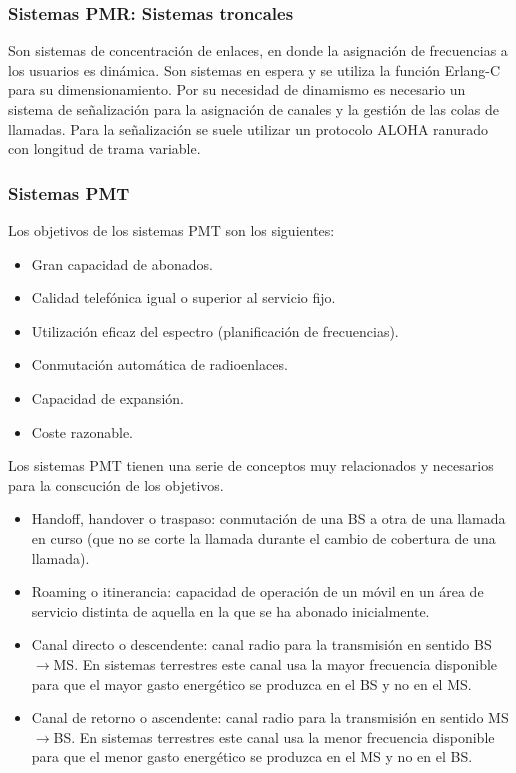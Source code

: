 \subsubsection{Sistemas PMR: Sistemas troncales}
\label{ssub:troncales}
	Son sistemas de concentración de enlaces, en donde la asignación de frecuencias a los usuarios es dinámica. Son sistemas en espera y se utiliza la función Erlang-C para su dimensionamiento. Por su necesidad de dinamismo es necesario un sistema de señalización para la asignación de canales y la gestión de las colas de llamadas. Para la señalización se suele utilizar un protocolo ALOHA ranurado con longitud de trama variable.\\	
\subsubsection{Sistemas PMT}
\label{ssub:PMT}
	Los objetivos de los sistemas PMT son los siguientes:
\begin{itemize}
	\item Gran capacidad de abonados.
	\item Calidad telefónica igual o superior al servicio fijo.
	\item Utilización eficaz del espectro (planificación de frecuencias).
	\item Conmutación automática de radioenlaces.
	\item Capacidad de expansión.
	\item Coste razonable.
\end{itemize}
Los sistemas PMT tienen una serie de conceptos muy relacionados y necesarios para la conscución de los objetivos.
\begin{itemize}
	\item Handoff, handover o traspaso: conmutación de una BS a otra de una llamada en curso (que no se corte la llamada durante el cambio de cobertura de una llamada).
	\item Roaming o itinerancia: capacidad de operación de un móvil en un área de servicio distinta de aquella en la que se ha abonado inicialmente.
	\item Canal directo o descendente: canal radio para la transmisión en sentido BS$\to$MS. En sistemas terrestres este canal usa la mayor frecuencia disponible para que el mayor gasto energético se produzca en el BS y no en el MS.
	\item Canal de retorno o ascendente: canal radio para la transmisión en sentido MS$\to$BS. En sistemas terrestres este canal usa la menor frecuencia disponible para que el menor gasto energético se produzca en el MS y no en el BS.
\end{itemize}
